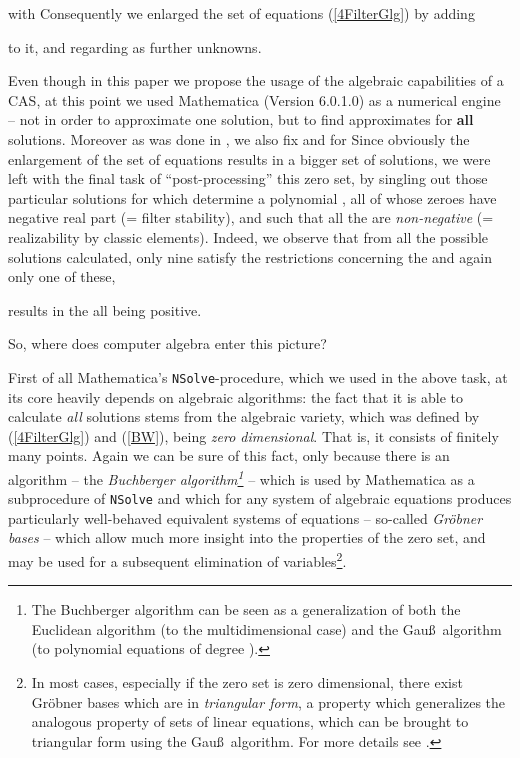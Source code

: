 \documentclass[10pt,twocolumn,pagenumbers]{IEEEtran}
\begin{document}
with  Consequently we enlarged the set of equations (\ref{4FilterGlg}) by adding

to it, and regarding  as further unknowns.

Even though in this paper we propose the usage of the algebraic capabilities of a CAS, at this point we used Mathematica (Version 6.0.1.0) as a numerical engine -- not in order to approximate one solution, but to find approximates for {\bf all} solutions. Moreover as was done in \cite{HieuDiss}, we also fix  and  for  Since obviously the enlargement of the set of equations results in a bigger set of solutions, we were left with the final task of ``post-processing'' this zero set, by singling out those particular solutions for which  determine a polynomial , all of whose zeroes have negative real part (= filter stability), and such that all the  are {\sl non-negative} (= realizability by classic elements). Indeed, we observe that from all the possible solutions calculated, only nine satisfy the restrictions concerning the  and again only one of these, 

results in the  all being positive.

So, where does computer algebra enter this picture?

First of all Mathematica's {\tt NSolve}-procedure, which we used in the above task, at its core heavily depends on algebraic algorithms: the fact that it is able to calculate {\sl all} solutions stems from the algebraic variety, which was defined by (\ref{4FilterGlg}) and (\ref{BW}), being {\sl zero dimensional}. That is, it consists of finitely many points.
Again we can be sure of this fact, only because there is an algorithm -- the {\sl Buchberger algorithm\footnote{The Buchberger algorithm can be seen as a generalization of both the Euclidean algorithm (to the multidimensional case) and the Gau\ss\ algorithm (to polynomial equations of degree ).}} -- which is used by Mathematica as a subprocedure of {\tt NSolve} and which for any system of algebraic equations produces particularly well-behaved equivalent systems of equations -- so-called {\sl Gr\"obner bases} -- which allow much more insight into the properties of the zero set, and may be used for a subsequent elimination of variables\footnote{In most cases, especially if the zero set is zero dimensional, there exist Gr\"obner bases which are in {\sl triangular form}, a property which generalizes the analogous property of sets of linear equations, which can be brought to triangular form using the Gau\ss\ algorithm. For more details see \cite{CoxIdeals,CoxUsing}.}. 
\end{document}
